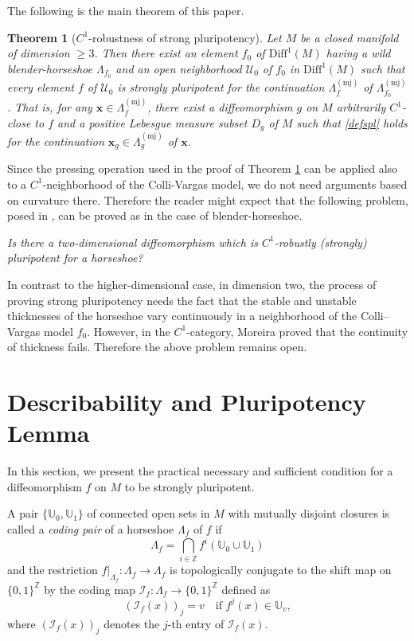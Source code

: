 \documentclass{amsart}
\theoremstyle{plain}
\newtheorem{mtheorem}{Theorem}
\theoremstyle{definition}
\numberwithin{equation}{section}
\numberwithin{figure}{section}
\def\bx{{\boldsymbol{x}}}
\def\cu{{\mathcal{U}}}
\def\diff{\mathrm{Diff}}
\begin{document}
\medskip


The following is the main theorem of this paper.

\begin{mtheorem}[$C^1$-robustness of strong pluripotency]\label{mainthm}
Let $M$ be a closed manifold of dimension $\geq 3$.
Then there exist an element $f_{0}$ of $\diff^{1}(M)$ having a wild blender-horseshoe $\Lambda_{f_0}$ 
and an open neighborhood $\cu_0$ of $f_0$ in $\diff^{1}(M)$ such that  every element $f$ of $\mathcal{U}_0$ is strongly pluripotent for the continuation $\Lambda_{f}^{(\mathrm{mj})}$ of $\Lambda_{f_0}^{(\mathrm{mj})}$.
That is, for any $\bx\in \Lambda_f^{(\mathrm{mj})}$, there exist a diffeomorphism $g$ on $M$ arbitrarily $C^1$-close to $f$ and  a positive Lebesgue measure subset $D_{g}$ of $M$ such that \eqref{defspl} holds for the continuation $\bx_{g}\in \Lambda_{g}^{(\mathrm{mj})}$ of $\bx$.
\end{mtheorem}


Since the pressing operation used in the proof of Theorem \ref{mainthm} can be applied also to a $C^1$-neighborhood of the Colli-Vargas model, we do not need arguments based on curvature there.
Therefore the reader might expect that the following problem, posed in \cite{KLNSV}, can be proved as in the case of blender-horseshoe.


\medskip
\emph{
Is there a two-dimensional diffeomorphism which is $C^1$-robustly (strongly)
pluripotent for a horseshoe?
}
\medskip

In contrast to the higher-dimensional case, in dimension two, the process of proving strong pluripotency needs the fact that the stable and unstable thicknesses of the horseshoe vary continuously in a neighborhood of the Colli--Vargas model $f_0$.
However, in the $C^1$-category, Moreira \cite{M11} proved that the continuity of thickness fails.
Therefore the above problem remains open.



\section{Describability and Pluripotency Lemma}\label{S_describable}

In this section, we present the practical necessary and sufficient condition for a diffeomorphism $f$ on 
$M$ to be strongly pluripotent.

A pair $\{\mathbb{U}_0,\mathbb{U}_1\}$ of connected open sets in $M$ with mutually disjoint closures 
 is called a  \emph{coding pair} of a horseshoe $\Lambda_f$ of $f$ if 
\[
\Lambda_f =\bigcap_{i\in \mathbb{Z}} f^{i}(\mathbb U_0 \cup \mathbb U_1)
\]
and the restriction $f|_{\Lambda_f}:\Lambda_f\longrightarrow \Lambda_f$ is topologically conjugate 
to the shift map on $ \{ 0,1\} ^{\mathbb Z}$ by the coding map  
$\mathcal{I}_f: \Lambda_f  \longrightarrow  \{ 0,1\} ^{\mathbb Z}$ defined as 
\[
\left(\mathcal{I}_f(x) \right)_j = v \quad \text{if $f^j(x) \in \mathbb U_{v}$}, 
\]
where $(\mathcal{I}_f(x) )_j$ denotes the $j$-th entry of $\mathcal{I}_f(x)$. 
\end{document}
